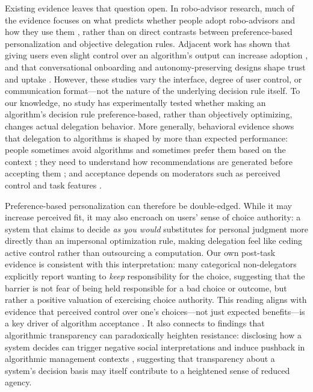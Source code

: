 \documentclass[a4paper, 12pt, fleqn]{article}
\theoremstyle{definition}
\begin{document}
Existing evidence leaves that question open. In robo-advisor research, much of the evidence focuses on what predicts whether people adopt robo-advisors and how they use them \citep[for example,][]{Mahmud2025}, rather than on direct contrasts between preference-based personalization and objective delegation rules. Adjacent work has shown that giving users even slight control over an algorithm's output can increase adoption \citep{Dietvorst2018}, and that conversational onboarding and autonomy-preserving designs shape trust and uptake \citep{Hildebrand2021,Fink2024}. However, these studies vary the interface, degree of user control, or communication format---not the nature of the underlying decision rule itself. To our knowledge, no study has experimentally tested whether making an algorithm's decision rule preference-based, rather than objectively optimizing, changes actual delegation behavior. More generally, behavioral evidence shows that delegation to algorithms is shaped by more than expected performance: people sometimes avoid algorithms and sometimes prefer them based on the context \citep{Dietvorst2018,Logg2019}; they need to understand how recommendations are generated before accepting them \citep{Yeomans2019}; and acceptance depends on moderators such as perceived control and task features \citep{Mahmud2022,Chugunova2022}.

Preference-based personalization can therefore be double-edged. While it may increase perceived fit, it may also encroach on users' sense of choice authority: a system that claims to decide \emph{as you would} substitutes for personal judgment more directly than an impersonal optimization rule, making delegation feel like ceding active control rather than outsourcing a computation. Our own post-task evidence is consistent with this interpretation: many categorical non-delegators explicitly report wanting to \emph{keep} responsibility for the choice, suggesting that the barrier is not fear of being held responsible for a bad choice or outcome, but rather a positive valuation of exercising choice authority. This reading aligns with evidence that perceived control over one's choices---not just expected benefits---is a key driver of algorithm acceptance \citep{Schaap2024}. It also connects to findings that algorithmic transparency can paradoxically heighten resistance: disclosing how a system decides can trigger negative social interpretations \citep{Chen2024} and induce pushback in algorithmic management contexts \citep{Hu2024}, suggesting that transparency about a system's decision basis may itself contribute to a heightened sense of reduced agency.
\end{document}
